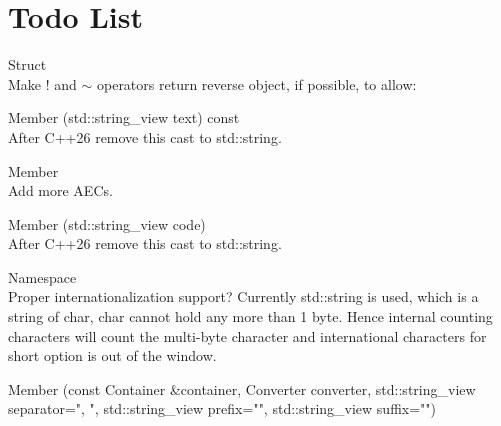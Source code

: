 \chapter{Todo List}
\hypertarget{todo}{}\label{todo}

\begin{DoxyRefList}
\item[Struct \doxylink{structauspicious__library_1_1aec_1_1aec__t}{auspicious\+\_\+library\+::aec\+::aec\+\_\+t} ]\hfill \\
\label{todo__todo000002}%
%
Make ! and \texorpdfstring{$\sim$}{\string~} operators return reverse object, if possible, to allow\+:  
\item[Member \doxylink{structauspicious__library_1_1aec_1_1aec__t_ac7c8650fe2525de9bbeea55c478b74a9}{auspicious\+\_\+library\+::aec\+::aec\+\_\+t\+::operator()} (std\+::string\+\_\+view text) const]\hfill \\
\label{todo__todo000004}%
%
After C++26 remove this cast to std\+::string.  
\item[Member \doxylink{namespaceauspicious__library_1_1aec_af8881b9d6d857581a4e1c5f7b482d715}{auspicious\+\_\+library\+::aec\+::reset} ]\hfill \\
\label{todo__todo000003}%
%
Add more AECs.  
\item[Member \doxylink{namespaceauspicious__library_1_1aec_aa1ee086ed35c793b0ca65b04e20eddf6}{auspicious\+\_\+library\+::aec\+::sgr} (std\+::string\+\_\+view code)]\hfill \\
\label{todo__todo000001}%
%
After C++26 remove this cast to std\+::string.  
\item[Namespace \doxylink{namespaceauspicious__library_1_1ap}{auspicious\+\_\+library\+::ap} ]\hfill \\
\label{todo__todo000005}%
%
Proper internationalization support? Currently std\+::string is used, which is a string of char, char cannot hold any more than 1 byte. Hence internal counting characters will count the multi-\/byte character and international characters for short option is out of the window.  
\item[Member \doxylink{namespaceauspicious__library_1_1sm_af4d2d6d72a9c765f4fe02a0462d35bcf}{auspicious\+\_\+library\+::sm\+::to\+\_\+string} (const Container \&container, Converter converter, std\+::string\+\_\+view separator="{}, "{}, std\+::string\+\_\+view prefix="{}"{}, std\+::string\+\_\+view suffix="{}"{})]\hfill \\

\end{DoxyRefList}
